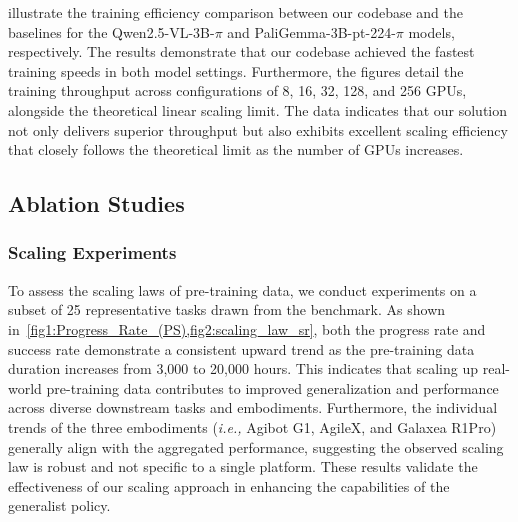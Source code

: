 illustrate the training efficiency comparison between our codebase and the baselines for the Qwen2.5-VL-3B-$\pi$ and PaliGemma-3B-pt-224-$\pi$ models, respectively. The results demonstrate that our codebase achieved the fastest training speeds in both model settings. Furthermore, the figures detail the training throughput across configurations of 8, 16, 32, 128, and 256 GPUs, alongside the theoretical linear scaling limit. The data indicates that our solution not only delivers superior throughput but also exhibits excellent scaling efficiency that closely follows the theoretical limit as the number of GPUs increases.








\subsection{Ablation Studies}
\subsubsection{Scaling Experiments}
To assess the scaling laws of pre-training data, we conduct experiments on a subset of 25 representative tasks drawn from the benchmark.
As shown in~\cref{fig1:Progress_Rate_(PS),fig2:scaling_law_sr}, both the progress rate and success rate demonstrate a consistent upward trend as the pre-training data duration increases from 3,000 to 20,000 hours.
This indicates that scaling up real-world pre-training data contributes to improved generalization and performance across diverse downstream tasks and embodiments.
Furthermore, the individual trends of the three embodiments (\textit{i.e.,} Agibot G1, AgileX, and Galaxea R1Pro) generally align with the aggregated performance, suggesting the observed scaling law is robust and not specific to a single platform. These results validate the effectiveness of our scaling approach in enhancing the capabilities of the generalist policy.




